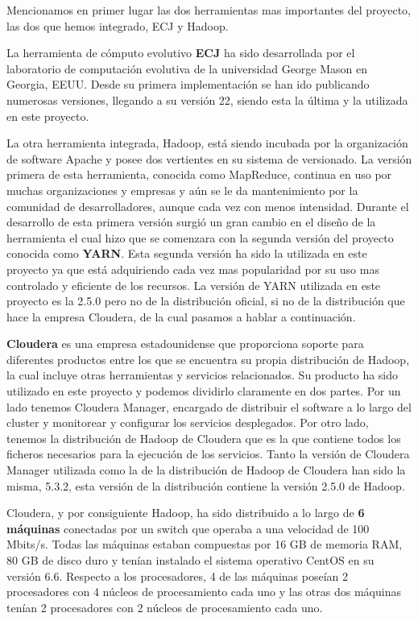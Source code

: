 Mencionamos en primer lugar las dos herramientas mas importantes del proyecto, las dos que hemos integrado, ECJ y Hadoop.

La herramienta de c\'omputo evolutivo \textbf{ECJ} ha sido desarrollada por el laboratorio de computaci\'on evolutiva de la universidad George Mason en Georgia, EEUU. Desde su primera implementaci\'on se han ido publicando numerosas versiones, llegando a su versi\'on 22, siendo esta la \'ultima y la utilizada en este proyecto.

La otra herramienta integrada, Hadoop, est\'a siendo incubada por la organizaci\'on de software Apache y posee dos vertientes en su sistema de versionado. La versi\'on primera de esta herramienta, conocida como MapReduce, continua en uso por muchas organizaciones y empresas y a\'un se le da mantenimiento por la comunidad de desarrolladores, aunque cada vez con menos intensidad. Durante el desarrollo de esta primera versi\'on surgió un gran cambio en el dise\~no de la herramienta el cual hizo que se comenzara con la segunda versi\'on del proyecto conocida como \textbf{YARN}. Esta segunda versi\'on ha sido la utilizada en este proyecto ya que est\'a adquiriendo cada vez mas popularidad por su uso mas controlado y eficiente de los recursos. La versi\'on de YARN utilizada en este proyecto es la 2.5.0 pero no de la distribuci\'on oficial, si no de la distribuci\'on que hace la empresa Cloudera, de la cual pasamos a hablar a continuaci\'on.

\textbf{Cloudera} es una empresa estadounidense que proporciona soporte para diferentes productos entre los que se encuentra su propia distribuci\'on de Hadoop, la cual incluye otras herramientas y servicios relacionados. Su producto ha sido utilizado en este proyecto y podemos dividirlo claramente en dos partes. Por un lado tenemos Cloudera Manager, encargado de distribuir el software a lo largo del cluster y monitorear y configurar los servicios desplegados. Por otro lado, tenemos la distribuci\'on de Hadoop de Cloudera que es la que contiene todos los ficheros necesarios para la ejecuci\'on de los servicios. Tanto la versi\'on de Cloudera Manager utilizada como la de la distribuci\'on de Hadoop de Cloudera han sido la misma, 5.3.2, esta versi\'on de la distribuci\'on contiene la versi\'on 2.5.0 de Hadoop.

Cloudera, y por consiguiente Hadoop, ha sido distribuido a lo largo de \textbf{6 m\'aquinas} conectadas por un switch que operaba a una velocidad de 100 Mbits/s. Todas las m\'aquinas estaban compuestas por 16 GB de memoria RAM, 80 GB de disco duro y tenían instalado el sistema operativo CentOS en su versi\'on 6.6. Respecto a los procesadores, 4 de las m\'aquinas poseían 2 procesadores con 4 n\'ucleos de procesamiento cada uno y las otras dos m\'aquinas tenían 2 procesadores con 2 n\'ucleos de procesamiento cada uno.

